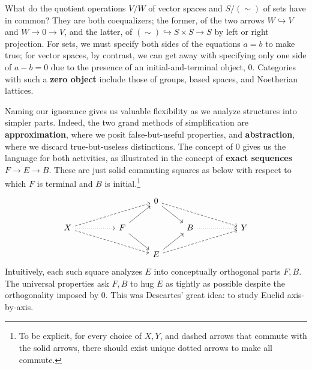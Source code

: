 \documentclass[11pt, justified]{tufte-book}
\theoremstyle{definition}
\begin{document}
        What do the quotient operations $V/W$ of vector spaces and $S/(\sim)$
        of sets have in common?  They are both coequalizers; the former, of
        the two arrows $W\hookrightarrow V$ and $W\to 0\to V$, and the latter,
        of $(\sim)\hookrightarrow S\times S\to S$ by left or right projection.
        For sets, we must specify both sides of the equations $a=b$ to make
        true; for vector spaces, by contrast, we can get away with specifying
        only one side of $a-b=0$ due to the presence of an initial-and-terminal
        object, $0$.  Categories with such a \textbf{zero object} include
        those of groups, based spaces, and Noetherian lattices.

        Naming our ignorance gives us valuable flexibility as we analyze
        structures into simpler parts.  Indeed, the two grand methods of
        simplification are \textbf{approximation}, where we posit
        false-but-useful properties, and \textbf{abstraction}, where we discard
        true-but-useless distinctions.  The concept of $0$ gives us the language
        for both activities, as illustrated in the concept of 
        \textbf{exact sequences} $F\to E\to B$.  These are just solid commuting
        squares
        as below with respect to which $F$ is terminal and $B$ is
        initial.\footnote{
            To be explicit, for every choice of $X,Y$, and dashed arrows that
            commute with the solid arrows, there should exist unique dotted
            arrows to make all commute.
        }
        $$
            \begin{tikzcd}
                                                                           &  &                         & 0 \arrow[rd] \arrow[rrrd, dashed] &                      &  &   \\
            X \arrow[rrru, dashed] \arrow[rrrd, dashed] \arrow[rr, dotted] &  & F \arrow[ru] \arrow[rd] &                                   & B \arrow[rr, dotted] &  & Y \\
                                                                           &  &                         & E \arrow[ru] \arrow[rrru, dashed] &                      &  &  
            \end{tikzcd}
        $$
        Intuitively, each such square analyzes $E$ into conceptually orthogonal
        parts $F, B$.  The universal properties ask $F, B$ to hug $E$ as
        tightly as possible despite the orthogonality imposed by $0$.  This was
        Descartes' great idea: to study Euclid axis-by-axis.
\end{document}
